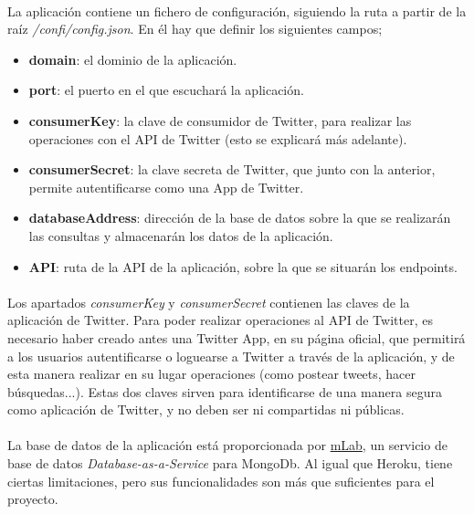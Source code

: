 \documentclass[a4paper]{article}
\begin{document}
\paragraph{}La aplicación contiene un fichero de configuración, siguiendo la ruta a partir de la raíz \textit{/confi/config.json}. En él hay que definir los siguientes campos;
\begin{itemize}
\item \textbf{domain}: el dominio de la aplicación.
\item \textbf{port}: el puerto en el que escuchará la aplicación.
\item \textbf{consumerKey}: la clave de consumidor de Twitter, para realizar las operaciones con el API de Twitter (esto se explicará más adelante).
\item \textbf{consumerSecret}: la clave secreta de Twitter, que junto con la anterior, permite autentificarse como una App de Twitter.
\item \textbf{databaseAddress}: dirección de la base de datos sobre la que se realizarán las consultas y almacenarán los datos de la aplicación.
\item \textbf{API}: ruta de la API de la aplicación, sobre la que se situarán los endpoints.
\end{itemize}

\paragraph{}Los apartados \textit{consumerKey} y \textit{consumerSecret} contienen las claves de la aplicación de Twitter. Para poder realizar operaciones al API de Twitter, es necesario haber creado antes una Twitter App, en su página oficial, que permitirá a los usuarios autentificarse o loguearse a Twitter a través de la aplicación, y de esta manera realizar en su lugar operaciones (como postear tweets, hacer búsquedas...). Estas dos claves sirven para identificarse de una manera segura como aplicación de Twitter, y no deben ser ni compartidas ni públicas.

\paragraph{}La base de datos de la aplicación está proporcionada por \href{https://mlab.com/}{mLab}, un servicio de base de datos \textit{Database-as-a-Service} para MongoDb. Al igual que Heroku, tiene ciertas limitaciones, pero sus funcionalidades son más que suficientes para el proyecto.
\end{document}

